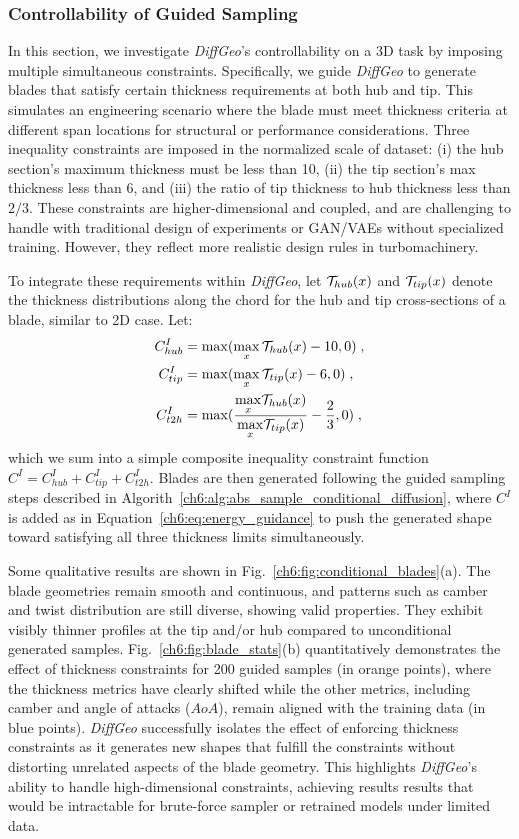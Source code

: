 \subsubsection{Controllability of Guided Sampling}
In this section, we investigate \textit{DiffGeo}'s controllability on a 3D task by imposing multiple simultaneous constraints. Specifically, we guide \textit{DiffGeo} to generate blades that satisfy certain thickness requirements at both hub and tip. This simulates an engineering scenario where the blade must meet thickness criteria at different span locations for structural or performance considerations. Three inequality constraints are imposed in the normalized scale of dataset: (i) the hub section’s maximum thickness must be less than 10, (ii) the tip section’s max thickness less than 6, and (iii) the ratio of tip thickness to hub thickness less than $2/3$. These constraints are higher-dimensional and coupled, and are challenging to handle with traditional design of experiments or GAN/VAEs without specialized training. However, they reflect more realistic design rules in turbomachinery.

To integrate these requirements within \textit{DiffGeo}, let $\mathcal{T}_{hub}(x)$ and $\mathcal{T}_{tip}(x)$ denote the thickness distributions along the chord for the hub and tip cross-sections of a blade, similar to 2D case. Let:
\begin{align}
    C^I_{hub} &= \max (\max_x \mathcal{T}_{hub}(x)-10, 0) \;, \\
    C^I_{tip} &= \max (\max_x \mathcal{T}_{tip}(x)-6, 0) \;, \\
    C^I_{t2h} &= \max (\frac{\underset{x}\max \mathcal{T}_{hub}(x)}{\underset{x}\max \mathcal{T}_{tip}(x)}- \frac{2}{3}, 0) \;,
\end{align}
which we sum into a simple composite inequality constraint function $C^I = C^I_{hub} + C^I_{tip} + C^I_{t2h}$. Blades are then generated following the guided sampling steps described in Algorith~\ref{ch6:alg:abs_sample_conditional_diffusion}, where $C^I$ is added as in Equation~\ref{ch6:eq:energy_guidance} to push the generated shape toward satisfying all three thickness limits simultaneously.

Some qualitative results are shown in Fig.~\ref{ch6:fig:conditional_blades}(a). The blade geometries remain smooth and continuous, and patterns such as camber and twist distribution are still diverse, showing valid properties. They exhibit visibly thinner profiles at the tip and/or hub compared to unconditional generated samples. Fig.~\ref{ch6:fig:blade_stats}(b) quantitatively demonstrates the effect of thickness constraints for 200 guided samples (in orange points), where the thickness metrics have clearly shifted while the other metrics, including camber and angle of attacks ($AoA$), remain aligned with the training data (in blue points). \textit{DiffGeo} successfully isolates the effect of enforcing thickness constraints as it generates new shapes that fulfill the constraints without distorting unrelated aspects of the blade geometry. This highlights \textit{DiffGeo}’s ability to handle high-dimensional constraints, achieving results results that would be intractable for brute-force sampler or retrained models under limited data.


